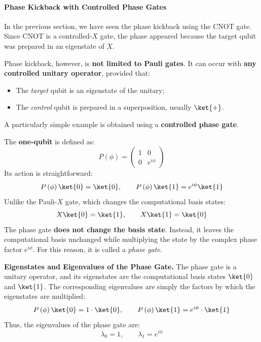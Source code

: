 \paragraph{Phase Kickback with Controlled Phase Gates}\label{ex:phase-kickback-with-controlled-phase-gates}

In the previous section, we have seen the phase kickback using the CNOT gate. Since CNOT is a controlled-$X$ gate, the phase appeared because the target qubit was prepared in an eigenstate of $X$.

\highspace
Phase kickback, however, is \textbf{not limited to Pauli gates}. It can occur with \textbf{any controlled unitary operator}, provided that:
\begin{itemize}
    \item The \emph{target} qubit is an eigenstate of the unitary;
    \item The \emph{control} qubit is prepared in a superposition, usually $\ket{+}$.
\end{itemize}
A particularly simple example is obtained using a \textbf{controlled phase gate}.

\highspace
The \textbf{one-qubit}  is defined as:
\begin{equation}
    P\left(\phi\right) = \begin{pmatrix}
        1 & 0 \\
        0 & e^{i\phi}
    \end{pmatrix}
\end{equation}
Its action is straightforward:
\begin{equation*}
    P\left(\phi\right)\ket{0} = \ket{0}, \qquad P\left(\phi\right)\ket{1} = e^{i\phi}\ket{1}
\end{equation*}
Unlike the Pauli-$X$ gate, which changes the computational basis states:
\begin{equation*}
    X\ket{0} = \ket{1}, \qquad X\ket{1} = \ket{0}
\end{equation*}
The phase gate \textbf{does not change the basis state}. Instead, it leaves the computational basis unchanged while multiplying the state  by the complex phase factor $e^{i\phi}$. For this reason, it is called a \emph{phase gate}.

\highspace
\textcolor{Green3}{ \textbf{Eigenstates and Eigenvalues of the Phase Gate.}} The phase gate is a unitary operator, and its eigenstates are the computational basis states $\ket{0}$ and $\ket{1}$. The corresponding eigenvalues are simply the factors by which the eigenstates are multiplied:
\begin{equation*}
    P\left(\phi\right)\ket{0} = 1 \cdot \ket{0}, \qquad P\left(\phi\right)\ket{1} = e^{i\phi} \cdot \ket{1}
\end{equation*}
Thus, the eigenvalues of the phase gate are:
\begin{equation*}
    \lambda_0 = 1, \qquad \lambda_1 = e^{i\phi}
\end{equation*}

